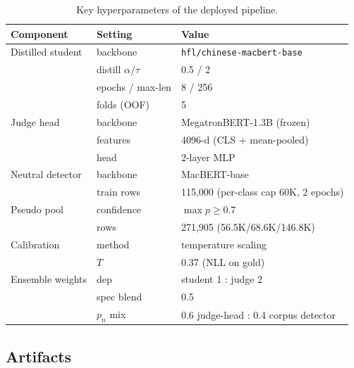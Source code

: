 \documentclass[11pt,a4paper]{article}
\newcommand{\code}[1]{\texttt{#1}}
\begin{document}
\begin{table}[H]
\centering\small
\caption{Key hyperparameters of the deployed pipeline.}
\label{tab:hparams}
\begin{tabular}{lll}
\toprule
Component & Setting & Value \\
\midrule
Distilled student & backbone & \code{hfl/chinese-macbert-base} \\
                   & distill $\alpha/\tau$ & 0.5 / 2 \\
                   & epochs / max-len & 8 / 256 \\
                   & folds (OOF) & 5 \\
Judge head         & backbone & MegatronBERT-1.3B (frozen) \\
                   & features & 4096-d (CLS + mean-pooled) \\
                   & head & 2-layer MLP \\
Neutral detector   & backbone & MacBERT-base \\
                   & train rows & 115{,}000 (per-class cap 60K, 2 epochs) \\
Pseudo pool        & confidence & $\max p \ge 0.7$ \\
                   & rows & 271{,}905 (56.5K/68.6K/146.8K) \\
Calibration        & method & temperature scaling \\
                   & $T$ & 0.37 (NLL on gold) \\
Ensemble weights   & dep & student 1 : judge 2 \\
                   & spec blend & 0.5 \\
                   & $p_n$ mix & 0.6 judge-head : 0.4 corpus detector \\
\bottomrule
\end{tabular}
\end{table}

\subsection{Artifacts}
\end{document}
